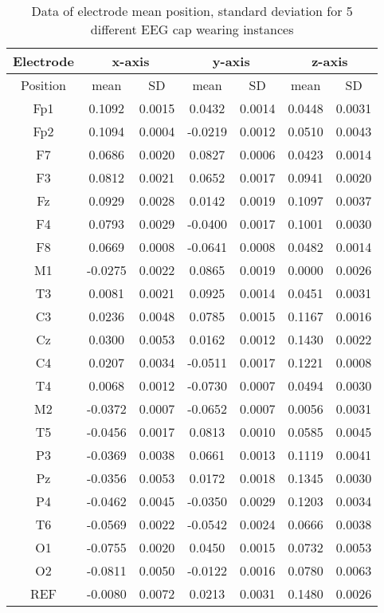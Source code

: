 \begin{table}[hbt!]
	\centering
	\begin{tabular}{|c|c|c|c|c|c|c|}
		\hline
		Electrode & \multicolumn{2}{c}{x-axis} & \multicolumn{2}{|c}{y-axis} & \multicolumn{2}{|c|}{z-axis} \\ \hline
		Position & mean & SD & mean & SD & mean & SD \\ \hline
		Fp1 & 0.1092 & 0.0015 & 0.0432 & 0.0014 & 0.0448 & 0.0031 \\ 
		Fp2 & 0.1094 & 0.0004 & -0.0219 & 0.0012 & 0.0510 & 0.0043 \\ 
		F7 & 0.0686 & 0.0020 & 0.0827 & 0.0006 & 0.0423 & 0.0014 \\ 
		F3 & 0.0812 & 0.0021 & 0.0652 & 0.0017 & 0.0941 & 0.0020 \\ 
		Fz & 0.0929 & 0.0028 & 0.0142 & 0.0019 & 0.1097 & 0.0037 \\ 
		F4 & 0.0793 & 0.0029 & -0.0400 & 0.0017 & 0.1001 & 0.0030 \\ 
		F8 & 0.0669 & 0.0008 & -0.0641 & 0.0008 & 0.0482 & 0.0014 \\ 
		M1 & -0.0275 & 0.0022 & 0.0865 & 0.0019 & 0.0000 & 0.0026 \\ 
		T3 & 0.0081 & 0.0021 & 0.0925 & 0.0014 & 0.0451 & 0.0031 \\ 
		C3 & 0.0236 & 0.0048 & 0.0785 & 0.0015 & 0.1167 & 0.0016 \\ 
		Cz & 0.0300 & 0.0053 & 0.0162 & 0.0012 & 0.1430 & 0.0022 \\ 
		C4 & 0.0207 & 0.0034 & -0.0511 & 0.0017 & 0.1221 & 0.0008 \\ 
		T4 & 0.0068 & 0.0012 & -0.0730 & 0.0007 & 0.0494 & 0.0030 \\ 
		M2 & -0.0372 & 0.0007 & -0.0652 & 0.0007 & 0.0056 & 0.0031 \\ 
		T5 & -0.0456 & 0.0017 & 0.0813 & 0.0010 & 0.0585 & 0.0045 \\ 
		P3 & -0.0369 & 0.0038 & 0.0661 & 0.0013 & 0.1119 & 0.0041 \\ 
		Pz & -0.0356 & 0.0053 & 0.0172 & 0.0018 & 0.1345 & 0.0030 \\ 
		P4 & -0.0462 & 0.0045 & -0.0350 & 0.0029 & 0.1203 & 0.0034 \\ 
		T6 & -0.0569 & 0.0022 & -0.0542 & 0.0024 & 0.0666 & 0.0038 \\ 
		O1 & -0.0755 & 0.0020 & 0.0450 & 0.0015 & 0.0732 & 0.0053 \\ 
		O2 & -0.0811 & 0.0050 & -0.0122 & 0.0016 & 0.0780 & 0.0063 \\ 
		REF & -0.0080 & 0.0072 & 0.0213 & 0.0031 & 0.1480 & 0.0026 \\ 
		\hline
	\end{tabular}
	\caption{Data of electrode mean position, standard deviation for 5 different EEG cap wearing instances}
	\label{tab:5x_blue_cap_mean_std}
\end{table}



